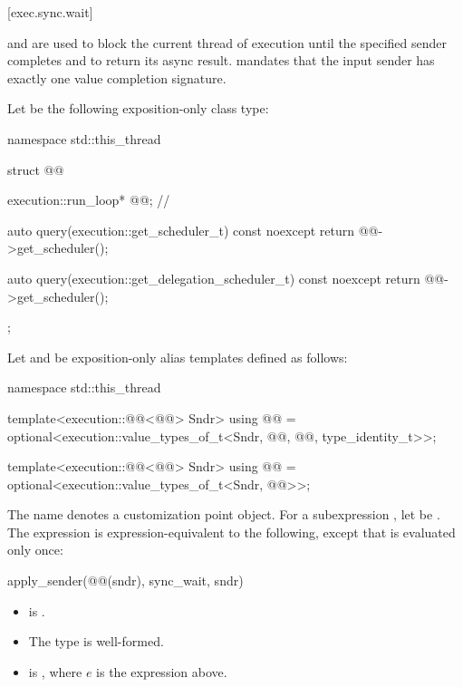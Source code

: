 [exec.sync.wait]{}

\pnum
{} and 
are used
to block the current thread of execution
until the specified sender completes and
to return its async result.
 mandates
that the input sender has exactly one value completion signature.

\pnum
Let  be the following exposition-only class type:
\begin{codeblock}
namespace std::this_thread {
  struct @@ {
    execution::run_loop* @@;                                  // \expos

    auto query(execution::get_scheduler_t) const noexcept {
      return @@->get_scheduler();
    }

    auto query(execution::get_delegation_scheduler_t) const noexcept {
      return @@->get_scheduler();
    }
  };
}
\end{codeblock}

\pnum
Let  and
be exposition-only alias templates defined as follows:
\begin{codeblock}
namespace std::this_thread {
  template<execution::@@<@@> Sndr>
    using @@ =
      optional<execution::value_types_of_t<Sndr, @@, @@,
               type_identity_t>>;

  template<execution::@@<@@> Sndr>
    using @@ =
      optional<execution::value_types_of_t<Sndr, @@>>;
}
\end{codeblock}

\pnum
The name  denotes a customization point object.
For a subexpression , let  be .
The expression 
is expression-equivalent to the following,
except that  is evaluated only once:
\begin{codeblock}
apply_sender(@@(sndr), sync_wait, sndr)
\end{codeblock}
\mandates
\begin{itemize}
\item
{} is .
\item
The type  is well-formed.
\item
{}
is , where $e$ is the  expression above.
\end{itemize}

